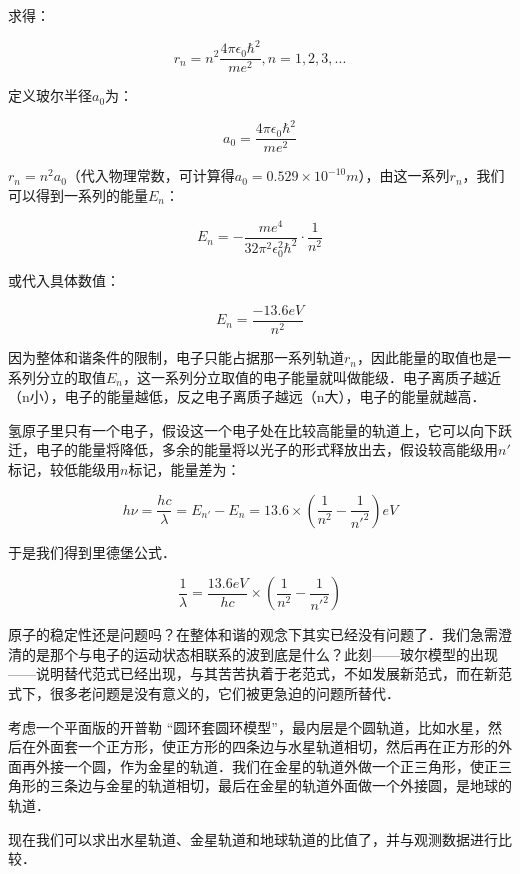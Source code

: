 求得：

\begin{equation}
r_n = n^2 \frac{4 \pi \epsilon_0 \hbar^2  }{ m e^2}, n = 1, 2, 3, ...
\end{equation}

定义玻尔半径$a_0$为：

\begin{equation}
a_0 = \frac{4 \pi \epsilon_0 \hbar^2  }{ m e^2}
\end{equation}

$r_n = n^2 a_0$（代入物理常数，可计算得$a_0 = 0.529 \times 10^{-10} m$），由这一系列$r_n$，我们可以得到一系列的能量$E_n$：

\begin{equation}
E_n = - \frac{m e^4 }{ 32 \pi^2 \epsilon_0^2 \hbar^2 } \cdot {\frac{1}{n^2}}
\end{equation}

或代入具体数值：

\begin{equation}
E_n = \frac{-13.6 eV}{n^2}
\end{equation}

因为整体和谐条件的限制，电子只能占据那一系列轨道$r_n$，因此能量的取值也是一系列分立的取值$E_n$，这一系列分立取值的电子能量就叫做能级．电子离质子越近（n小），电子的能量越低，反之电子离质子越远（n大），电子的能量就越高．

氢原子里只有一个电子，假设这一个电子处在比较高能量的轨道上，它可以向下跃迁，电子的能量将降低，多余的能量将以光子的形式释放出去，假设较高能级用$n'$标记，较低能级用$n$标记，能量差为：

\begin{equation}
h \nu = \frac{hc}{\lambda} = E_{n'} - E_n = 13.6 \times \left( \frac{1}{n^2}  - \frac{1}{n'^2} \right) eV 
\end{equation}

于是我们得到里德堡公式．

\begin{equation}
\frac{1}{\lambda } = \frac{13.6 eV}{hc} \times \left( \frac{1}{n^2}  - \frac{1}{n'^2} \right)
\end{equation}

原子的稳定性还是问题吗？在整体和谐的观念下其实已经没有问题了．我们急需澄清的是那个与电子的运动状态相联系的波到底是什么？此刻——玻尔模型的出现——说明替代范式已经出现，与其苦苦执着于老范式，不如发展新范式，而在新范式下，很多老问题是没有意义的，它们被更急迫的问题所替代．

\begin{exercise}{}
考虑一个平面版的开普勒 “圆环套圆环模型”，最内层是个圆轨道，比如水星，然后在外面套一个正方形，使正方形的四条边与水星轨道相切，然后再在正方形的外面再外接一个圆，作为金星的轨道．我们在金星的轨道外做一个正三角形，使正三角形的三条边与金星的轨道相切，最后在金星的轨道外面做一个外接圆，是地球的轨道．

现在我们可以求出水星轨道、金星轨道和地球轨道的比值了，并与观测数据进行比较．
\end{exercise}

